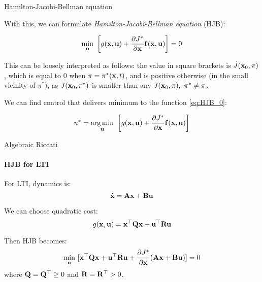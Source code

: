\documentclass{beamer}
\begin{document}
\begin{frame}{Hamilton-Jacobi-Bellman equation}
\begin{flushleft}

With this, we can formulate \emph{Hamilton-Jacobi-Bellman equation} (HJB):

\begin{equation}
\label{eq:HJB_0}
\underset{\bo{u}}{\min} \ 
\left[ 
g(\bo{x}, \bo{u}) + 
\frac{\partial J^*}{\partial \bo{x}} \bo{f} (\bo{x}, \bo{u}) 
\right] = 0
\end{equation}

This can be loosely interpreted as follows: the value in square brackets is $\dot J(\mathbf{x}_0, \pi)$, which is equal to 0 when $\pi = \pi^*(\mathbf{x}, t)$, and is positive otherwise (in the small vicinity of $\pi^*$), as $J(\mathbf{x}_0, \pi^*)$ is smaller than any $J(\mathbf{x}_0, \pi), \ \pi^* \neq \pi$.

\bigskip


We can find control that delivers minimum to the function \eqref{eq:HJB_0}:

\begin{equation}
u^* = \underset{\bo{u}}{\argmin} \ 
\left[ 
g(\bo{x}, \bo{u}) + 
\frac{\partial J^*}{\partial \bo{x}} \bo{f} (\bo{x}, \bo{u}) \right] 
\end{equation}

\end{flushleft}
\end{frame}





\begin{frame}{Algebraic Riccati}
\framesubtitle{HJB for LTI}
\begin{flushleft}

For LTI, dynamics is:
\begin{equation}
\dot {\mathbf{x}} = \mathbf{A}  \mathbf{x} + \mathbf{B} \mathbf{u}
\end{equation}

We can choose quadratic cost:
\begin{equation}
g(\mathbf  x, \mathbf  u) = 
\mathbf  x^\top \mathbf{Q} \mathbf{x} +
\mathbf  u^\top \mathbf{R} \mathbf{u} 
\end{equation}

Then HJB becomes:
\begin{equation}
\underset{\mathbf{u}}{\min} \ [ 
\mathbf{x}^\top \mathbf{Q} \mathbf{x} +
\mathbf{u}^\top \mathbf{R} \mathbf{u} + 
\frac{\partial J^*}{\partial \mathbf{x}} 
(\mathbf{A} \mathbf{x} + \mathbf{B} \mathbf{u})] = 0
\end{equation}
%
where $\mathbf{Q} = \mathbf{Q}^\top \geq 0 $ and $\mathbf{R} = \mathbf{R}^\top > 0$.

\end{flushleft}
\end{frame}
\end{document}
